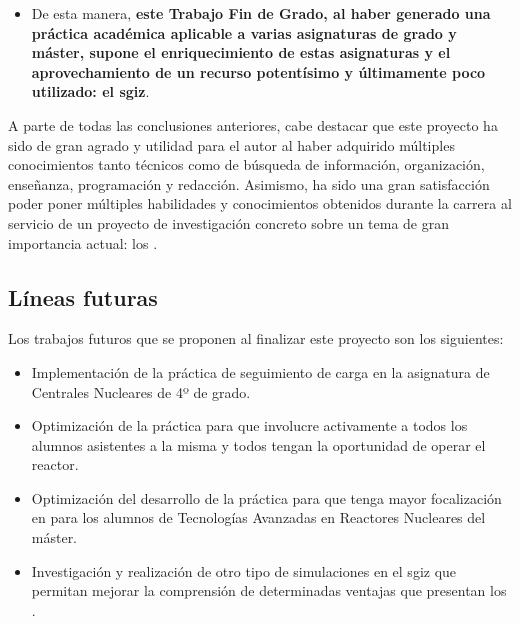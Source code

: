 \begin{itemize}
    \item De esta manera, \textbf{este Trabajo Fin de Grado, al haber generado una práctica académica aplicable a varias asignaturas de grado y máster, supone el enriquecimiento de estas asignaturas y el aprovechamiento de un recurso potentísimo y últimamente poco utilizado: el \acrshort{sgiz}}.
\end{itemize}

A parte de todas las conclusiones anteriores, cabe destacar que este proyecto ha sido de gran agrado y utilidad para el autor al haber adquirido múltiples conocimientos tanto técnicos como de búsqueda de información, organización, enseñanza, programación y redacción. Asimismo, ha sido una gran satisfacción poder poner múltiples habilidades y conocimientos obtenidos durante la carrera al servicio de un proyecto de investigación concreto sobre un tema de gran importancia actual: los .

\subsection{Líneas futuras}

Los trabajos futuros que se proponen al finalizar este proyecto son los siguientes:

\begin{itemize}
    \item Implementación de la práctica de seguimiento de carga en la asignatura de Centrales Nucleares de 4º de grado.
    \item Optimización de la práctica para que involucre activamente a todos los alumnos asistentes a la misma y todos tengan la oportunidad de operar el reactor.
    \item Optimización del desarrollo de la práctica para que tenga mayor focalización en  para los alumnos de Tecnologías Avanzadas en Reactores Nucleares del máster.
    \item Investigación y realización de otro tipo de simulaciones en el \acrshort{sgiz} que permitan mejorar la comprensión de determinadas ventajas que presentan los .
\end{itemize}